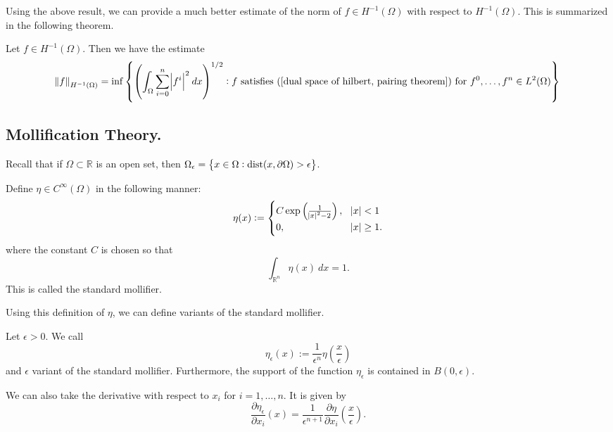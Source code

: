 \documentclass[10pt]{article}
\begin{document}
Using the above result, we can provide a much better estimate of the norm of $f \in H^{-1}(\Omega)$ with respect to $H^{-1}(\Omega)$. This is summarized in the following theorem. 
\begin{theorem}
	Let $f \in H^{-1}(\Omega)$. Then we have the estimate
	\begin{equation*}
		\displaystyle \norm{f}_{H^{-1}(\Omega)} = \inf\left\{ \left(\int_{\Omega}{\sum\limits_{i=0}^{n}{\abs{f^i}^2} \: dx}\right)^{1/2} : f \textrm{ satisfies } (\ref{dual space of hilbert, pairing theorem}) \textrm{ for } f^0, \dots, f^n \in L^2(\Omega) \right\}
	\end{equation*}
\end{theorem}
\subsection{Mollification Theory.}
Recall that if $\Omega \subset \mathbb{R}$ is an open set, then $\Omega_\epsilon = \left\{ x \in \Omega : \operatorname{dist}(x,\partial\Omega) > \epsilon \right\}$. 
\begin{definition}
	Define $\eta \in C^{\infty}(\Omega)$ in the following manner:
	\begin{equation*}
		\displaystyle \eta(x) := \begin{cases}
		C\exp\left(\frac{1}{\abs{x}^2 - 2}\right), & \abs{x} < 1 \\
		0, & \abs{x} \geq 1.
		\end{cases}
	\end{equation*}
	where the constant $C$ is chosen so that 
	\begin{equation*}
		\displaystyle \int_{\mathbb{R}^n}{\eta(x) \: dx} = 1.
	\end{equation*}
	This is called the standard mollifier.
\end{definition}
Using this definition of $\eta$, we can define variants of the standard mollifier.
\begin{definition}
	Let $\epsilon > 0$. We call 
	\begin{equation*}
		\displaystyle \eta_\epsilon(x) := \frac{1}{\epsilon^n}\eta\left( \frac{x}{\epsilon} \right)
	\end{equation*}
	and $\epsilon$ variant of the standard mollifier. Furthermore, the support of the function $\eta_\epsilon$ is contained in $B(0,\epsilon)$.  
\end{definition}
We can also take the derivative with respect to $x_i$ for $i = 1, \dots, n$. It is given by 
\begin{equation*}
 	\displaystyle \frac{\partial \eta_\epsilon}{\partial x_i}(x) = \frac{1}{\epsilon^{n+1}}\frac{\partial \eta}{\partial x_i}\left(\frac{x}{\epsilon}\right).
\end{equation*}
\end{document}
